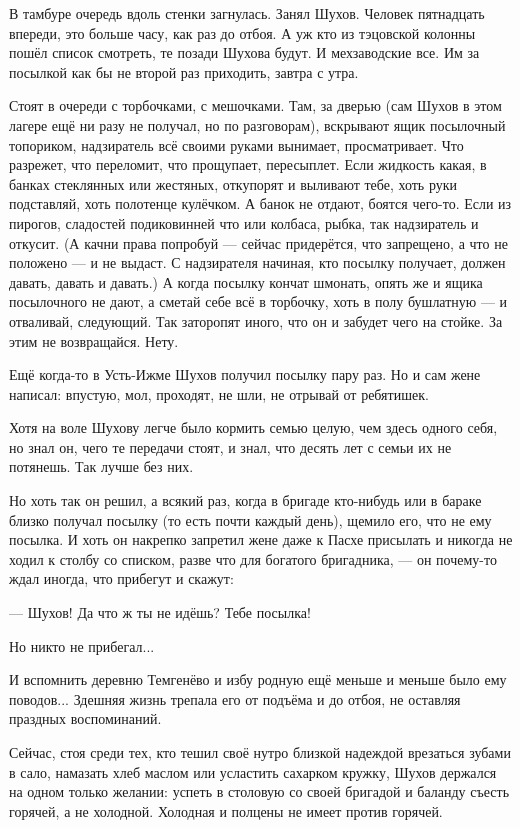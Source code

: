 В тамбуре очередь вдоль стенки загнулась. Занял Шухов. Человек пятнадцать впереди, это
больше часу, как раз до отбоя. А уж кто из тэцовской колонны пошёл список смотреть, те позади
Шухова будут. И мехзаводские все. Им за посылкой как бы не второй раз приходить, завтра с утра.

Стоят в очереди с торбочками, с мешочками. Там, за дверью (сам Шухов в этом лагере ещё ни разу
не получал, но по разговорам), вскрывают ящик посылочный топориком, надзиратель всё своими
руками вынимает, просматривает. Что разрежет, что переломит, что прощупает, пересыплет. Если
жидкость какая, в банках стеклянных или жестяных, откупорят и выливают тебе, хоть руки
подставляй, хоть полотенце кулёчком. А банок не отдают, боятся чего-то. Если из пирогов,
сладостей подиковинней что или колбаса, рыбка, так надзиратель и откусит. (А качни права
попробуй --- сейчас придерётся, что запрещено, а что не положено --- и не выдаст. С надзирателя
начиная, кто посылку получает, должен давать, давать и давать.) А когда посылку кончат
шмонать, опять же и ящика посылочного не дают, а сметай себе всё в торбочку, хоть в полу
бушлатную --- и отваливай, следующий. Так заторопят иного, что он и забудет чего на стойке. За
этим не возвращайся. Нету.

Ещё когда-то в Усть-Ижме Шухов получил посылку пару раз. Но и сам жене написал: впустую, мол,
проходят, не шли, не отрывай от ребятишек.

Хотя на воле Шухову легче было кормить семью целую, чем здесь одного себя, но знал он, чего те
передачи стоят, и знал, что десять лет с семьи их не потянешь. Так лучше без них.

Но хоть так он решил, а всякий раз, когда в бригаде кто-нибудь или в бараке близко получал
посылку (то есть почти каждый день), щемило его, что не ему посылка. И хоть он накрепко
запретил жене даже к Пасхе присылать и никогда не ходил к столбу со списком, разве что для
богатого бригадника, --- он почему-то ждал иногда, что прибегут и скажут:

--- Шухов! Да что ж ты не идёшь? Тебе посылка!

Но никто не прибегал...

И вспомнить деревню Темгенёво и избу родную ещё меньше и меньше было ему поводов... Здешняя
жизнь трепала его от подъёма и до отбоя, не оставляя праздных воспоминаний.

Сейчас, стоя среди тех, кто тешил своё нутро близкой надеждой врезаться зубами в сало,
намазать хлеб маслом или усластить сахарком кружку, Шухов держался на одном только желании:
успеть в столовую со своей бригадой и баланду съесть горячей, а не холодной. Холодная и
полцены не имеет против горячей.

